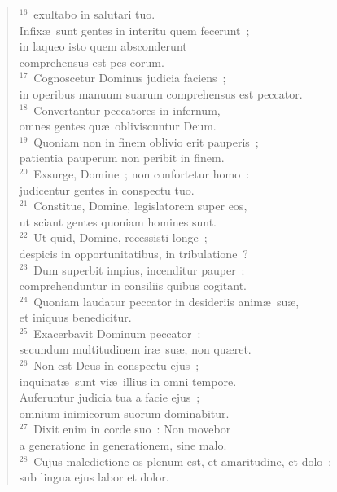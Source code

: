 \begin{verse}
${}^{16}$~exultabo in salutari tuo.\\ Infix\ae\ sunt gentes in interitu quem fecerunt~;\\ in laqueo isto quem absconderunt\\ comprehensus est pes eorum.\\
${}^{17}$~Cognoscetur Dominus judicia faciens~;\\ in operibus manuum suarum comprehensus est peccator.\\
${}^{18}$~Convertantur peccatores in infernum,\\ omnes gentes qu\ae\ obliviscuntur Deum.\\
${}^{19}$~Quoniam non in finem oblivio erit pauperis~;\\ patientia pauperum non peribit in finem.\\
${}^{20}$~Exsurge, Domine~; non confortetur homo~:\\ judicentur gentes in conspectu tuo.\\
${}^{21}$~Constitue, Domine, legislatorem super eos,\\ ut sciant gentes quoniam homines sunt.\\
${}^{22}$~Ut quid, Domine, recessisti longe~;\\ despicis in opportunitatibus, in tribulatione~?\\
${}^{23}$~Dum superbit impius, incenditur pauper~:\\ comprehenduntur in consiliis quibus cogitant.\\
${}^{24}$~Quoniam laudatur peccator in desideriis anim\ae\ su\ae ,\\ et iniquus benedicitur.\\
${}^{25}$~Exacerbavit Dominum peccator~:\\ secundum multitudinem ir\ae\ su\ae , non qu\ae ret.\\
${}^{26}$~Non est Deus in conspectu ejus~;\\ inquinat\ae\ sunt vi\ae\ illius in omni tempore.\\ Auferuntur judicia tua a facie ejus~;\\ omnium inimicorum suorum dominabitur.\\
${}^{27}$~Dixit enim in corde suo~: Non movebor\\ a generatione in generationem, sine malo.\\
${}^{28}$~Cujus maledictione os plenum est, et amaritudine, et dolo~;\\ sub lingua ejus labor et dolor.\\

\end{verse}
